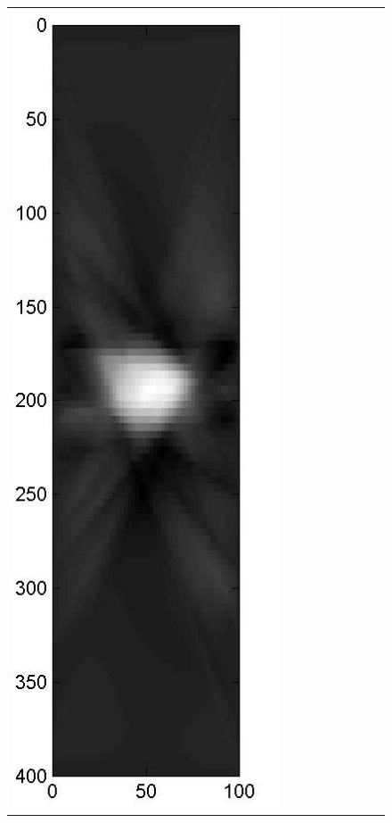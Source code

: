 \documentclass[english]{siamltex}
\begin{document}
{\begin{figure}[!h]
\begin{center}
\begin{tabular}{|c|c|c|c|c|c|c|c|c|}
			\includegraphics[width=.9\iwidth]{figures/newFigs/noisy/resultsExp-4-mk}
			&

\end{tabular}
\end{center}
\end{figure}}
\end{document}
